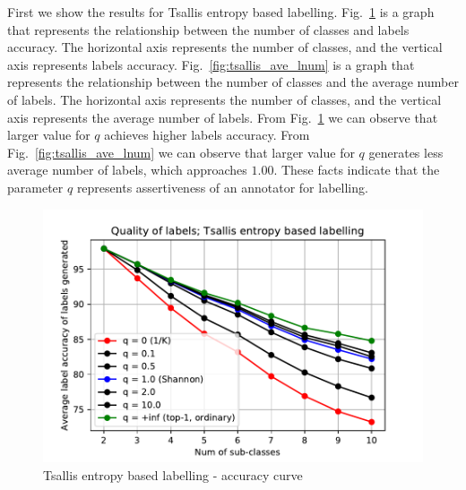 \documentclass[a4paper,conference]{IEEEtran}
\begin{document}
First we show the results for Tsallis entropy based labelling.
Fig.~\ref{fig:tsallis_acc} is a graph that represents the relationship between the number of classes and labels accuracy.
The horizontal axis represents the number of classes, and the vertical axis represents labels accuracy.
Fig.~\ref{fig:tsallis_ave_lnum} is a graph that represents the relationship between the number of classes and the average number of labels.
The horizontal axis represents the number of classes, and the vertical axis represents the average number of labels.
From Fig.~\ref{fig:tsallis_acc} we can observe that larger value for $q$ achieves higher labels accuracy.
From Fig.~\ref{fig:tsallis_ave_lnum} we can observe that larger value for $q$ generates less average number of labels, which approaches $1.00$.
These facts indicate that the parameter $q$ represents assertiveness of an annotator for labelling.

\begin{figure}[t]
\begin{center}
    \includegraphics[width=1.0\linewidth]{figs/graphs/tsallis-qs.pdf}
    \caption{Tsallis entropy based labelling - accuracy curve}
    \label{fig:tsallis_acc}
\end{center}
\end{figure}
\end{document}
